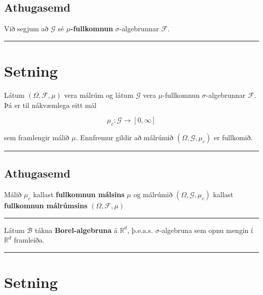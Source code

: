 \documentclass[]{book}
\begin{document}
\hypertarget{athugasemd-1}{%
\subsection{Athugasemd}\label{athugasemd-1}}

Við segjum að \(\mathcal G\) sé \(\mu\)\textbf{-fullkomnun} \(\sigma\)-algebrunnar \(\mathcal F\).

\begin{center}\rule{0.5\linewidth}{\linethickness}\end{center}

\hypertarget{setning-29}{%
\section{Setning}\label{setning-29}}

Látum \((\Omega, \mathcal F, \mu)\) vera málrúm og látum \(\mathcal G\) vera \(\mu\)-fullkomnun \(\sigma\)-algebrunnar \(\mathcal F\). Þá er til nákvæmlega eitt mál

\[
\mu_c: \mathcal G \rightarrow [0, \infty]
\]

sem framlengir málið \(\mu\). Ennfremur gildir að málrúmið \((\Omega, \mathcal G, \mu_c)\) er fullkomið.

\begin{center}\rule{0.5\linewidth}{\linethickness}\end{center}

\hypertarget{athugasemd-2}{%
\subsection{Athugasemd}\label{athugasemd-2}}

Málið \(\mu_c\) kallast \textbf{fullkomnun málsins} \(\mu\) og málrúmið \((\Omega, \mathcal G, \mu_c)\) kallast \textbf{fullkomnun málrúmsins} \((\Omega, \mathcal F, \mu)\)

\begin{center}\rule{0.5\linewidth}{\linethickness}\end{center}

Látum \(\mathcal B\) tákna \textbf{Borel-algebruna} á \(\mathbb R^d\), þ.e.a.s. \(\sigma\)-algebruna sem opnu mengin í \(\mathbb R^d\) framleiða.

\begin{center}\rule{0.5\linewidth}{\linethickness}\end{center}

\hypertarget{setning-30}{%
\section{Setning}\label{setning-30}}
\end{document}
